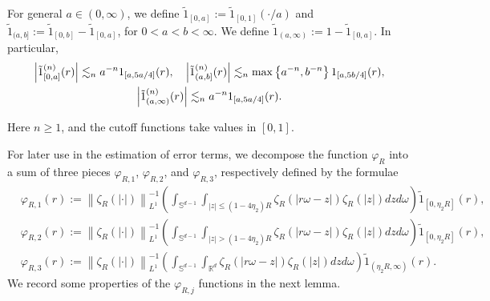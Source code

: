 \documentclass[reqno,11pt]{amsart}
\theoremstyle{plain}
\theoremstyle{definition}
\numberwithin{equation}{section}
\numberwithin{theorem}{section}
\def\geq{\geqslant}
\def\leq{\leqslant}
\def\R{\mathbb{R}}
\begin{document}
For general $a \in(0, \infty)$, we define $\tilde{1}_{[0, a]}:=\tilde{1}_{[0,1]}(\cdot / a)$ and $\tilde{1}_{(a, b]}:=\tilde{1}_{[0, b]}-\tilde{1}_{[0, a]}$, for $0<a<b<\infty$. We define $\tilde{1}_{(a, \infty)}:=1-\tilde{1}_{[0, a]}$. In particular,
\begin{gather}\label{mor2}
    \left|\tilde{1}_{[0, a]}^{(n)}(r)\right| \lesssim_{n} a^{-n} 1_{[a, 5 a / 4]}(r), \quad\left|\tilde{1}_{(a, b]}^{(n)}(r)\right| \lesssim_{n} \max \left\{a^{-n}, b^{-n}\right\} 1_{[a, 5 b / 4]}(r), \notag\\
    \left|\tilde{1}_{(a, \infty)}^{(n)}(r)\right| \lesssim_{n} a^{-n} 1_{[a, 5 a / 4]}(r).
\end{gather}

Here $n\geq1$, and the cutoff functions take values in $[0,1]$.

For later use in the estimation of error terms, we decompose the function $\varphi_{R}$ into a sum of three pieces $\varphi_{R, 1}$, $\varphi_{R, 2}$, and $\varphi_{R, 3}$, respectively defined by the formulae
\begin{align}
& \varphi_{R, 1}(r):=\left\|\zeta_{R}(|\cdot|)\right\|_{L^{1}}^{-1}\left(\int_{\mathbb{S}^{d-1}} \int_{|z| \leq\left(1-4 \eta_{2}\right) R} \zeta_{R}(|r \omega-z|) \zeta_{R}(|z|) d z d \omega\right) \tilde{1}_{\left[0, \eta_{2} R\right]}(r), \label{varphi1} \\
& \varphi_{R, 2}(r):=\left\|\zeta_{R}(|\cdot|)\right\|_{L^{1}}^{-1}\left(\int_{\mathbb{S}^{d-1}} \int_{|z|>\left(1-4 \eta_{2}\right) R} \zeta_{R}(|r \omega-z|) \zeta_{R}(|z|) d z d \omega\right) \tilde{1}_{\left[0, \eta_{2} R\right]}(r), \label{varphi2}\\
& \varphi_{R, 3}(r):=\left\|\zeta_{R}(|\cdot|)\right\|_{L^{1}}^{-1}\left(\int_{\mathbb{S}^{d-1}} \int_{\R^d} \zeta_{R}(|r \omega-z|) \zeta_{R}(|z|) d z d \omega\right) \tilde{1}_{\left( \eta_{2} R, \infty\right)}(r) .\label{varphi3}
\end{align}
We record some properties of the $\varphi_{R, j}$ functions in the next lemma.
\end{document}
